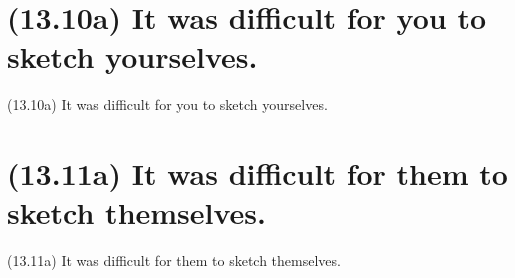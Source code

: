\documentclass{article}
\begin{document}
%
%

\section*{(13.10a) It was difficult for you to sketch yourselves.}

\bigbreak
\begin{enumerate*}
\item[(13.10a)] It was difficult for you to sketch yourselves.
\end{enumerate*}
\bigbreak

\bigbreak
\begin{minipage}{\textwidth}
\end{minipage}
\bigbreak

\clearpage

%
%

\section*{(13.11a) It was difficult for them to sketch themselves.}

\bigbreak
\begin{enumerate*}
\item[(13.11a)] It was difficult for them to sketch themselves.
\end{enumerate*}
\bigbreak
\end{document}
